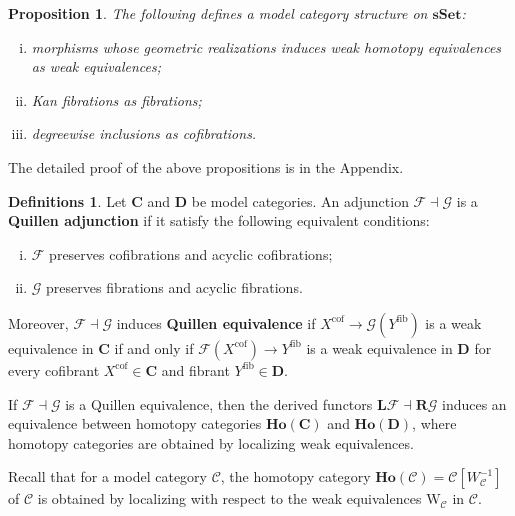 \documentclass[psamsfonts]{amsart}
\newtheorem{prop}[thm]{Proposition}
\theoremstyle{definition}
\newtheorem{defns}[thm]{Definitions}
\theoremstyle{remark}
\newcommand{\W}{\mathrm{W}}
\newcommand{\Ho}{\mathbf{Ho}}
\newcommand{\sSet}{\mathbf{sSet}}
\numberwithin{equation}{section}
\begin{document}
\begin{prop}
The following defines a model category structure on $\sSet$:
\begin{enumerate}[(i)]
    \item morphisms whose geometric realizations induces weak homotopy equivalences as weak equivalences;
    \item Kan fibrations as fibrations;
    \item degreewise inclusions as cofibrations.
\end{enumerate}
\end{prop}

The detailed proof of the above propositions is in the Appendix.

\begin{defns}
Let $\mathbf{C}$ and $\mathbf{D}$ be model categories. An adjunction $\mathcal{F}\dashv\mathcal{G}$ is a \textbf{Quillen adjunction} if it satisfy the following equivalent conditions:\begin{enumerate}[(i)]
    \item $\mathcal{F}$ preserves cofibrations and acyclic cofibrations;
    \item $\mathcal{G}$ preserves fibrations and acyclic fibrations.
\end{enumerate}
Moreover, $\mathcal{F}\dashv\mathcal{G}$ induces \textbf{Quillen equivalence} if $X^{\textrm{cof}}\to\mathcal{G}(Y^{\textrm{fib}})$ is a weak equivalence in $\mathbf{C}$ if and only if $\mathcal{F}(X^{\textrm{cof}})\to Y^{\textrm{fib}}$ is a weak equivalence in $\mathbf{D}$ for every cofibrant $X^{\textrm{cof}}\in\mathbf{C}$ and fibrant $Y^{\textrm{fib}}\in\mathbf{D}$.
\end{defns}

If $\mathcal{F}\dashv\mathcal{G}$ is a Quillen equivalence, then the derived functors $\mathbf{L}\mathcal{F}\dashv\mathbf{R}\mathcal{G}$ induces an equivalence between homotopy categories $\Ho(\mathbf{C})$ and $\Ho(\mathbf{D})$, where homotopy categories are obtained by localizing weak equivalences.

Recall that for a model category $\mathcal{C}$, the homotopy category $\Ho(\mathcal{C})=\mathcal{C}[W_\mathcal{C}^{-1}]$ of $\mathcal{C}$ is obtained by localizing with respect to the weak equivalences $\W_\mathcal{C}$ in $\mathcal{C}$.
\end{document}
